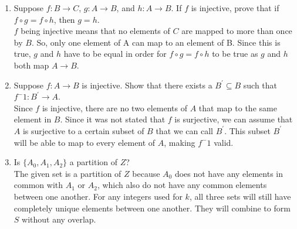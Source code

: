 \documentclass{article}
\begin{document}
\begin{enumerate}
\item Suppose $f: B \to C$, $g: A \to B$, and $h: A \to B$. If $f$ is injective, prove that if $f \circ g = f \circ h$, then $g=h$.  \\
    $f$ being injective means that no elements of $C$ are mapped to more than once by $B$. So, only one element of A can map to an element of B. Since this is true, $g$ and $h$ have to be equal in order for $f \circ g = f \circ h$ to be true as $g$ and $h$ both map $A \to B$.
\item Suppose $f: A \to B$ is injective. Show that there exists a $B^\prime \subseteq B$ such that $f^-1 : B^\prime \to A$. \\
    Since $f$ is injective, there are no two elements of $A$ that map to the same element in $B$. Since it was not stated that $f$ is surjective, we can assume that $A$ is surjective to a certain subset of $B$ that we can call $B^\prime$. This subset $B^\prime$ will be able to map to every element of $A$, making $f^-1$ valid.
\item Is $\{ A_{0}, A_{1}, A_{2} \}$ a partition of $Z$? \\
    The given set is a partition of $Z$ because $A_{0}$ does not have any elements in common with $A_{1}$ or $A_{2}$, which also do not have any common elements between one another. For any integers used for $k$, all three sets will still have completely unique elements between one another. They will combine to form $S$ without any overlap. 
\end{enumerate}
\end{document}
